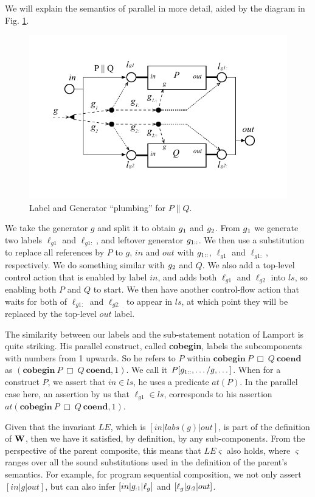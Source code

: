 We will explain the semantics of parallel in more detail,
aided by the diagram in Fig. \ref{fig:PAR-plumbing}.
\begin{figure}
  \includegraphics[scale=1.0]{images/PAR}
  \caption{Label and Generator ``plumbing'' for $P \parallel Q$.}
  \label{fig:PAR-plumbing}
\end{figure}
We take the generator $g$ and split it to obtain $g_{1}$ and $g_{2}$.
From $g_{1}$ we generate two labels $\ell_{g1}$ and $\ell_{g1:}$,
and leftover generator $g_{1::}$.
We then use a substitution to replace all references
by $P$ to $g$, $in$ and $out$ with $g_{1::}$, $\ell_{g1}$ and $\ell_{g1:}$,
respectively. We do something similar with $g_{2}$ and $Q$.
We also add a top-level control action that is enabled by label $in$,
and adds both $\ell_{g1}$ and $\ell_{g2}$ into $ls$,
so enabling both $P$ and $Q$ to start.
We then have another control-flow action that waits for both of $\ell_{g1:}$
and $\ell_{g2:}$  to appear in $ls$,
at which point they will be replaced by the top-level $out$ label.

The similarity between our labels and the sub-statement notation
of Lamport is quite striking.
His parallel construct, called \textbf{cobegin}, labels the subcomponents with
numbers from 1 upwards. So he refers to $P$ within
$\mathbf{cobegin}~P~ \Box~ Q~ \mathbf{coend}$
as $(\mathbf{cobegin} ~P~ \Box ~Q~ \mathbf{coend},1)$.
We call it $P[g_{1::},\dots/g,\dots]$.
When for a construct $P$, we assert that $in \in ls$,
he uses a predicate $at(P)$.
In the parallel case here, an assertion by us that $\ell_{g1} \in ls$,
corresponds to his assertion $at(\mathbf{cobegin} ~P~ \Box ~Q~ \mathbf{coend},1)$.


Given that the invariant $LE$, which is $[in|labs(g)|out]$,
is part of the definition of $\mathbf{W}$,
then we have it satisfied, by definition, by any sub-components.
From the perspective of the parent composite, this means that $LE\varsigma$
also holds, where $\varsigma$ ranges over all the sound substitutions
used in the definition of the parent's semantics.
For example, for program sequential composition,
we not only assert $[in|g|out]$,
but can also infer $[in|g_{:1}|\ell_g]$
and $[\ell_g|g_{:2}|out]$.


